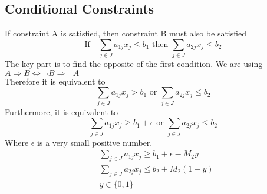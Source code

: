 \documentclass[10pt]{book}
\begin{document}
				\subsection{Conditional Constraints}
					 If constraint A is satisfied, then constraint B must also be satisfied
					\begin{equation}
						\text{If} \quad \sum_{j\in J} a_{1j} x_j \le b_1 \text{ then } \sum_{j\in J} a_{2j} x_j \le b_2 \nonumber
					\end{equation}
					The key part is to find the opposite of the first condition. We are using $A\Rightarrow B \Leftrightarrow \neg B \Rightarrow \neg A$\\
					Therefore it is equivalent to
					\begin{equation}
						\sum_{j\in J} a_{1j} x_j > b_1 \text{ or } \sum_{j\in J} a_{2j} x_j \le b_2 \nonumber
					\end{equation}
					Furthermore, it is equivalent to
					\begin{equation}
						\sum_{j\in J} a_{1j} x_j \ge b_1 + \epsilon \text{ or } \sum_{j\in J} a_{2j} x_j \le b_2 \nonumber
					\end{equation}
					Where $\epsilon$ is a very small positive number.\\
					\begin{align}
						& \sum_{j\in J} a_{1j} x_j \ge b_1 + \epsilon -  M_2y \nonumber \\
						& \sum_{j\in J} a_{2j} x_j \le b_2 + M_2(1-y) \nonumber \\
						& y \in \{0, 1\} \nonumber
					\end{align}	
				
\end{document}
